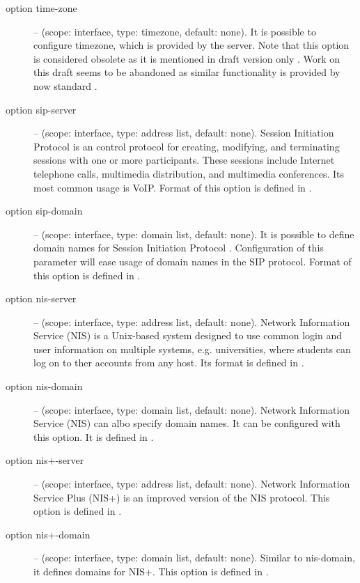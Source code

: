 \begin{description}
 \item[option time-zone] -- (scope: interface, type: timezone, default:
   none). It is possible to configure timezone, which is provided by
   the server. Note that this option is considered obsolete as it is
   mentioned in draft version only \cite{draft-timezone}. Work on this
   draft seems to be abandoned as similar functionality is provided by
   now standard \cite{rfc4075}.

 \item[option sip-server] -- (scope: interface, type: address list, default:
   none). Session Initiation Protocol \cite{rfc3263} is an control
   protocol for creating, modifying, and terminating sessions with one
   or more participants. These sessions include Internet telephone
   calls, multimedia distribution, and multimedia conferences. Its
   most common usage is VoIP. Format of this option is defined in
   \cite{rfc3319}.

 \item[option sip-domain] -- (scope: interface, type: domain list, default:
   none). It is possible to define domain names for Session Initiation
   Protocol \cite{rfc3263}. Configuration of this parameter will ease
   usage of domain names in the SIP protocol. Format of this option is
   defined in \cite{rfc3319}.

 \item[option nis-server] -- (scope: interface, type: address list, default:
   none). Network Information Service (NIS) is a Unix-based system
   designed to use common login and user information on multiple
   systems, e.g. universities, where students can log on to ther
   accounts from any host. Its format is defined in \cite{rfc3898}.

 \item[option nis-domain] -- (scope: interface, type: domain list, default:
   none). Network Information Service (NIS) can albo specify domain
   names. It can be configured with this option. It is defined in
   \cite{rfc3898}.

 \item[option nis+-server] -- (scope: interface, type: address list, default:
   none). Network Information Service Plus (NIS+) is an improved
   version of the NIS protocol. This option is defined in
   \cite{rfc3898}.

 \item[option nis+-domain] -- (scope: interface, type: domain list, default:
   none). Similar to nis-domain, it defines domains for NIS+. This
   option is defined in \cite{rfc3898}.


\end{description}
